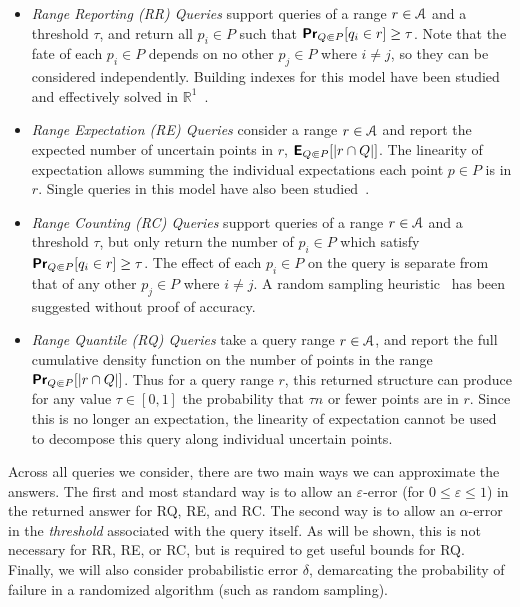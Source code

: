 \documentclass[11pt]{myclass}
\newcommand{\eps}{\varepsilon}
\newcommand{\Eu}[1]{\ensuremath{\EuScript{#1}}}
\newcommand{\bl}[1]{\ensuremath{\mathbb{#1}}}
\newcommand{\E}{\textbf{\textsf{E}}}
\renewcommand{\Pr}{\textbf{\textsf{Pr}}}
\newcommand{\RR}{\textsf{RR}\xspace}
\newcommand{\RC}{\textsf{RC}\xspace}
\newcommand{\RE}{\textsf{RE}\xspace}
\newcommand{\RQ}{\textsf{RQ}\xspace}
\newcommand{\denselist}{\vspace{-.1in} \itemsep -2pt\parsep=-1pt\partopsep -2pt}
\begin{document}
\begin{itemize}  \denselist
\item \emph{Range Reporting (\RR) Queries} support queries of a range $r \in \Eu{A}$ and a threshold $\tau$, and return all $p_i \in P$ such that $\Pr_{Q \Subset P} [q_i \in r] \geq \tau$. Note that the fate of each $p_i \in P$ depends on no other $p_j \in P$ where $i \neq j$, so they can be considered independently. Building indexes for this model have been studied~\cite{threshquery,efficientquery,TCXNKP05,ZLTZW12} and effectively solved in $\bl{R}^1$~\cite{ACTY09}.  
\item \emph{Range Expectation (\RE) Queries} consider a range $r \in \Eu{A}$ and report the expected number of uncertain points in $r$, $\E_{Q \Subset P}[ | r \cap Q | ]$. The linearity of expectation allows summing the individual expectations each point $p \in P$ is in $r$. Single queries in this model have also been studied~\cite{JKV07,BDJRV05,JMMV07}.
\item \emph{Range Counting (\RC) Queries} support queries of a range $r \in \Eu{A}$ and a threshold $\tau$, but only return the number of $p_i \in P$ which satisfy $\Pr_{Q \Subset P} [q_i \in r] \geq \tau$.  
The effect of each $p_i \in P$ on the query is separate from that of any other $p_j \in P$ where $i \neq j$.  A random sampling heuristic~\cite{aggregate} has been suggested without proof of accuracy.  
\item \emph{Range Quantile (\RQ) Queries} take a query range $r \in \Eu{A}$, and report the full cumulative density function on the number of points in the range $\Pr_{Q \Subset P} [ |r \cap Q| ]$.  Thus for a query range $r$, this returned structure can produce for any value $\tau \in [0,1]$ the probability that $\tau n$ or fewer points are in $r$.  
Since this is no longer an expectation, the linearity of expectation cannot be used to decompose this query along individual uncertain points.  
\end{itemize}
\vspace{-2mm}
Across all queries we consider, there are two main ways we can approximate the answers.  The first and most standard way is to allow an $\eps$-error (for $0 \leq \eps \leq 1$) in the returned answer for \RQ, \RE, and \RC. 
The second way is to allow an $\alpha$-error in the \emph{threshold} associated with the query itself.  As will be shown, this is not necessary for \RR, \RE, or \RC, but is required to get useful bounds for \RQ.  
Finally, we will also consider probabilistic error $\delta$, demarcating the probability of failure in a randomized algorithm (such as random sampling).  
\end{document}
